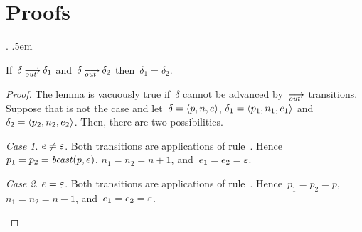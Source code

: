 \appendix
\section{Proofs}
\label{sec.proofs}

\theoremstyle{remark}
\newtheorem{case}{Case}
\makeatletter
{}%
  {\thm@preskip\topsep \divide\thm@preskip\tw@}%
  {\thm@postskip\thm@preskip}%
  {\addtolength{\@totalleftmargin}{\parindent}%
    \addtolength{\linewidth}{-\parindent}%
     \parindent \linewidth
    \normalfont}%
  {\z@}%
  {\itshape}%
  {.}%
  {.5em}%
  {}%
\makeatletter
\theoremstyle{subcase}
\newtheorem{subcase}{Case}


\begin{lemma}
  If~$\delta\out\delta_1$ and~$\delta\out\delta_2$ then~$\delta_1=\delta_2$.
\end{lemma}
\begin{proof}
  The lemma is vacuously true if~$\delta$ cannot be advanced by~$\out$
  transitions.  Suppose that is not the case and let~$\delta=\<p,n,e>$,
  $\delta_1=\<p_1,n_1,e_1>$ and~$\delta_2=\<p_2,n_2,e_2>$.  Then, there are
  two possibilities.
  \begin{case}
    $e\ne\varepsilon$.  Both transitions are applications of rule~.
    Hence~$p_1=p_2=\operatorname{\mathit{bcast}}(p,e)$, $n_1=n_2=n+1$, and~$e_1=e_2=\varepsilon$.
  \end{case}
  \begin{case}
    $e=\varepsilon$.  Both transitions are applications of rule~.
    Hence~$p_1=p_2=p$, $n_1=n_2=n-1$, and~$e_1=e_2=\varepsilon$.\qedhere
  \end{case}
\end{proof}

